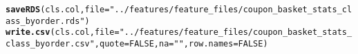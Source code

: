\documentclass[10pt]{article}
\makeatletter
\newcommand{\hlnum}[1]{\textcolor[rgb]{0.686,0.059,0.569}{#1}}%
\newcommand{\hlstr}[1]{\textcolor[rgb]{0.192,0.494,0.8}{#1}}%
\newcommand{\hlstd}[1]{\textcolor[rgb]{0.345,0.345,0.345}{#1}}%
\newcommand{\hlkwc}[1]{\textcolor[rgb]{0.333,0.667,0.333}{#1}}%
\newcommand{\hlkwd}[1]{\textcolor[rgb]{0.737,0.353,0.396}{\textbf{#1}}}%
\newenvironment{kframe}{%
 \def\at@end@of@kframe{}%
 \ifinner\ifhmode%
  \def\at@end@of@kframe{\end{minipage}}%
  \begin{minipage}{\columnwidth}%
 \fi\fi%
 \def\FrameCommand##1{\hskip\@totalleftmargin \hskip-\fboxsep
 \colorbox{shadecolor}{##1}\hskip-\fboxsep
     \hskip-\linewidth \hskip-\@totalleftmargin \hskip\columnwidth}%
 \MakeFramed {\advance\hsize-\width
   \@totalleftmargin\z@ \linewidth\hsize
   \@setminipage}}%
 {\par\unskip\endMakeFramed%
 \at@end@of@kframe}
\newenvironment{knitrout}{}{} %
\makeatother
\begin{document}
\begin{knitrout}
\begin{kframe}
\begin{alltt}
   \hlkwd{saveRDS}\hlstd{(cls.col,}\hlkwc{file}\hlstd{=}\hlstr{"../features/feature_files/coupon_basket_stats_class_byorder.rds"}\hlstd{)}
   \hlkwd{write.csv}\hlstd{(cls.col,}\hlkwc{file}\hlstd{=}\hlstr{"../features/feature_files/coupon_basket_stats_class_byorder.csv"}\hlstd{,}\hlkwc{quote}\hlstd{=}\hlnum{FALSE}\hlstd{,}\hlkwc{na}\hlstd{=}\hlstr{""}\hlstd{,}\hlkwc{row.names}\hlstd{=}\hlnum{FALSE}\hlstd{)}
\end{alltt}
\end{kframe}
\end{knitrout}
\end{document}
